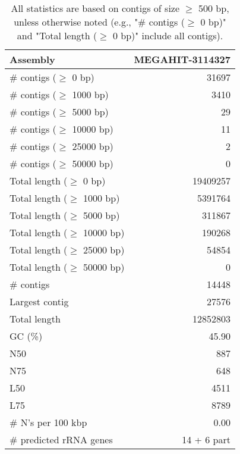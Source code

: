 \documentclass[12pt,a4paper]{article}
\begin{document}
\begin{table}[ht]
\begin{center}
\caption{All statistics are based on contigs of size $\geq$ 500 bp, unless otherwise noted (e.g., "\# contigs ($\geq$ 0 bp)" and "Total length ($\geq$ 0 bp)" include all contigs).}
\begin{tabular}{|l*{1}{|r}|}
\hline
Assembly & MEGAHIT-3114327 \\ \hline
\# contigs ($\geq$ 0 bp) & 31697 \\ \hline
\# contigs ($\geq$ 1000 bp) & 3410 \\ \hline
\# contigs ($\geq$ 5000 bp) & 29 \\ \hline
\# contigs ($\geq$ 10000 bp) & 11 \\ \hline
\# contigs ($\geq$ 25000 bp) & 2 \\ \hline
\# contigs ($\geq$ 50000 bp) & 0 \\ \hline
Total length ($\geq$ 0 bp) & 19409257 \\ \hline
Total length ($\geq$ 1000 bp) & 5391764 \\ \hline
Total length ($\geq$ 5000 bp) & 311867 \\ \hline
Total length ($\geq$ 10000 bp) & 190268 \\ \hline
Total length ($\geq$ 25000 bp) & 54854 \\ \hline
Total length ($\geq$ 50000 bp) & 0 \\ \hline
\# contigs & 14448 \\ \hline
Largest contig & 27576 \\ \hline
Total length & 12852803 \\ \hline
GC (\%) & 45.90 \\ \hline
N50 & 887 \\ \hline
N75 & 648 \\ \hline
L50 & 4511 \\ \hline
L75 & 8789 \\ \hline
\# N's per 100 kbp & 0.00 \\ \hline
\# predicted rRNA genes & 14 + 6 part \\ \hline
\end{tabular}
\end{center}
\end{table}
\end{document}

